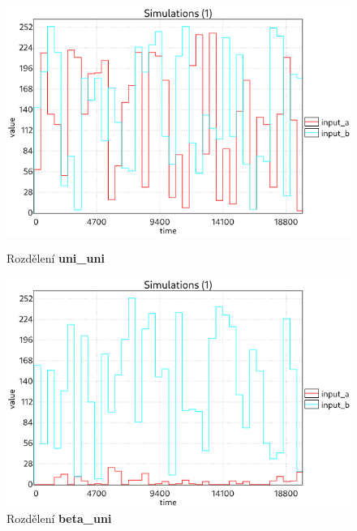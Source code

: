 \begin{figure}[H]
\centering
\begin{minipage}{.5\textwidth}
  \centering
  \includegraphics[width=0.95\linewidth]{obrazky-figures/inputs_uni_uni.png}
  \caption{Rozdělení \textbf{uni\_uni}}
  \label{fig:inputs_uni_uni}
\end{minipage}%
\begin{minipage}{.5\textwidth}
  \centering
  \includegraphics[width=0.95\linewidth]{obrazky-figures/inputs_beta_uni.png}
  \caption{Rozdělení \textbf{beta\_uni}}
  \label{fig:inputs_beta_uni}
\end{minipage}
\end{figure}

